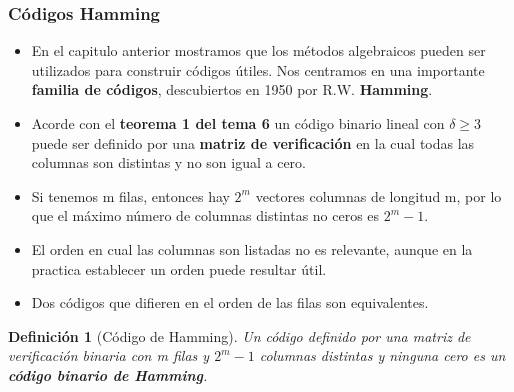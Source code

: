 \documentclass{beamer}
\theoremstyle{plain}
\newtheorem{definicion} [Definicion]{Definición}
\theoremstyle{example}
\theoremstyle{example}
\begin{document}
\begin{frame}  \frametitle{Códigos Hamming}\footnotesize

\begin{itemize} 

\item  En el capitulo anterior mostramos que los métodos algebraicos pueden ser utilizados para construir códigos útiles. Nos centramos en una importante \textbf{familia de códigos}, descubiertos en 1950 por R.W. \textbf{Hamming}.

\item Acorde con el \textbf{teorema 1 del tema 6} un código binario lineal con $\delta \geq 3$ puede ser definido por una \textbf{matriz de verificación} en la cual todas las columnas son distintas y no son igual a cero.

\item Si tenemos m filas, entonces hay $2^m$ vectores columnas de longitud m, por lo que el máximo número de columnas distintas no ceros es $2^m -1$.

\item El orden en cual las columnas son listadas no es relevante, aunque en la practica establecer un orden puede resultar útil.


\item Dos códigos que difieren en el orden de las filas son equivalentes.
\end{itemize} 

\footnotesize

\begin{definicion}[Código de Hamming]
Un código definido por una matriz de verificación binaria con m filas y $2^m -1$ columnas distintas y ninguna  cero es un \textbf{código binario de Hamming}.
\end{definicion}

\end{frame} 
\end{document}
